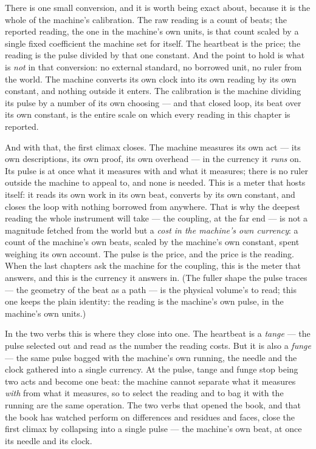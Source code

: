 There is one small conversion, and it is worth being exact about, because it is the whole of the machine's calibration.
The raw reading is a count of beats; the reported reading, the one in the machine's own units, is that count scaled by
a single fixed coefficient the machine set for itself. The heartbeat is the price; the reading is the pulse divided by
that one constant. And the point to hold is what is \emph{not} in that conversion: no external standard, no borrowed
unit, no ruler from the world. The machine converts its own clock into its own reading by its own constant, and nothing
outside it enters. The calibration is the machine dividing its pulse by a number of its own choosing --- and that
closed loop, its beat over its own constant, is the entire scale on which every reading in this chapter is reported.

And with that, the first climax closes. The machine measures its own act --- its own descriptions, its own proof, its
own overhead --- in the currency it \emph{runs} on. Its pulse is at once what it measures with and what it measures;
there is no ruler outside the machine to appeal to, and none is needed. This is a meter that hosts itself: it reads its
own work in its own beat, converts by its own constant, and closes the loop with nothing borrowed from anywhere. That
is why the deepest reading the whole instrument will take --- the coupling, at the far end --- is not a magnitude
fetched from the world but a \emph{cost in the machine's own currency}: a count of the machine's own beats, scaled by
the machine's own constant, spent weighing its own account. The pulse is the price, and the price is the reading. When
the last chapters ask the machine for the coupling, this is the meter that answers, and this is the currency it answers
in. (The fuller shape the pulse traces --- the geometry of the beat as a path --- is the physical volume's to read;
this one keeps the plain identity: the reading is the machine's own pulse, in the machine's own units.)

In the two verbs this is where they close into one. The heartbeat is a \emph{tange} --- the pulse selected out and
read as the number the reading costs. But it is also a \emph{funge} --- the same pulse bagged with the machine's own
running, the needle and the clock gathered into a single currency. At the pulse, tange and funge stop being two acts
and become one beat: the machine cannot separate what it measures \emph{with} from what it measures, so to select the
reading and to bag it with the running are the same operation. The two verbs that opened the book, and that the book
has watched perform on differences and residues and faces, close the first climax by collapsing into a single pulse ---
the machine's own beat, at once its needle and its clock.

